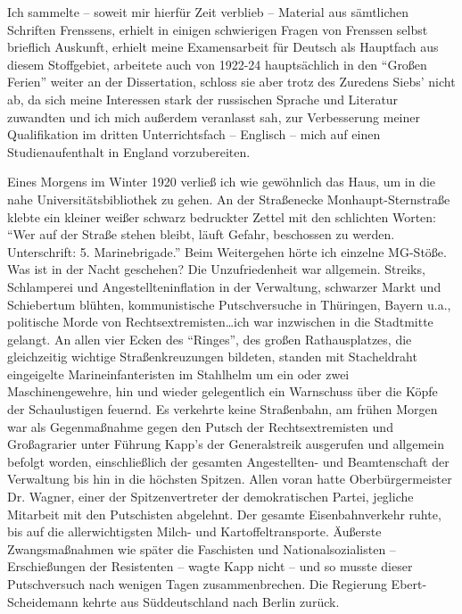 Ich sammelte -- soweit mir hierfür Zeit verblieb -- Material aus sämtlichen Schriften Frenssens, erhielt in einigen schwierigen Fragen von Frenssen selbst brieflich Auskunft, erhielt meine Examensarbeit für Deutsch als Hauptfach aus diesem Stoffgebiet, arbeitete auch von 1922-24 hauptsächlich in den \enquote{Großen Ferien} weiter an der Dissertation, schloss sie aber trotz des Zuredens Siebs' nicht ab, da sich meine Interessen stark der russischen Sprache und Literatur zuwandten und ich mich außerdem veranlasst sah, zur Verbesserung meiner Qualifikation im dritten Unterrichtsfach -- Englisch -- mich auf einen Studienaufenthalt in England vorzubereiten.

Eines Morgens im Winter 1920 verließ ich wie gewöhnlich das Haus, um in die nahe Universitätsbibliothek zu gehen. An der Straßenecke Monhaupt-Sternstraße klebte ein kleiner weißer schwarz bedruckter Zettel mit den schlichten Worten: \enquote{Wer auf der Straße stehen bleibt, läuft Gefahr, beschossen zu werden. Unterschrift: 5. Marinebrigade.} Beim Weitergehen hörte ich einzelne MG-Stöße. Was ist in der Nacht geschehen? Die Unzufriedenheit war allgemein. Streiks, Schlamperei und Angestellteninflation in der Verwaltung, schwarzer Markt und Schiebertum blühten, kommunistische Putschversuche in Thüringen, Bayern u.a., politische Morde von Rechtsextremisten\dots ich war inzwischen in die Stadtmitte gelangt. An allen vier Ecken des \enquote{Ringes}, des großen Rathausplatzes, die gleichzeitig wichtige Straßenkreuzungen bildeten, standen mit Stacheldraht eingeigelte Marineinfanteristen im Stahlhelm um ein oder zwei Maschinengewehre, hin und wieder gelegentlich ein Warnschuss über die Köpfe der Schaulustigen feuernd. Es verkehrte keine Straßenbahn, am frühen Morgen war als Gegenmaßnahme gegen den Putsch der Rechtsextremisten und Großagrarier unter Führung Kapp's der Generalstreik ausgerufen und allgemein befolgt worden, einschließlich der gesamten Angestellten- und Beamtenschaft der Verwaltung bis hin in die höchsten Spitzen. Allen voran hatte Oberbürgermeister Dr. Wagner, einer der Spitzenvertreter der demokratischen Partei, jegliche Mitarbeit mit den Putschisten abgelehnt. Der gesamte Eisenbahnverkehr ruhte, bis auf die allerwichtigsten Milch- und Kartoffeltransporte. Äußerste Zwangsmaßnahmen wie später die Faschisten und Nationalsozialisten -- Erschießungen der Resistenten -- wagte Kapp nicht -- und so musste dieser Putschversuch nach wenigen Tagen zusammenbrechen. Die Regierung Ebert-Scheidemann kehrte aus Süddeutschland nach Berlin zurück.


